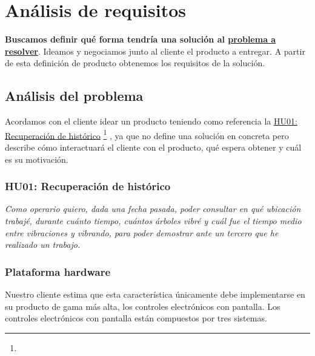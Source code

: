 \chapter{Análisis de requisitos}

\textbf{Buscamos definir qué forma tendría una solución al
\hyperref[sec:problema_a_resolver]{problema a resolver}}.
Ideamos y negociamos junto al cliente el producto a entregar.
A partir de esta definición de producto obtenemos los requisitos
de la solución.

\section{Análisis del problema}

Acordamos con el cliente idear un producto teniendo como referencia la
\hyperref[sec:HU01]{HU01: Recuperación de histórico}%
\footnote{%
}%
, ya que
no define una solución en concreta pero describe cómo interactuará
el cliente con el producto, qué espera obtener y cuál es su motivación.

\subsection{HU01: Recuperación de histórico} \label{sec:HU01}

{ \itshape Como operario quiero, dada una fecha pasada, poder consultar
en qué ubicación trabajé, durante cuánto tiempo, cuántos
árboles vibré y cuál fue el tiempo medio entre
vibraciones y vibrando, para poder demostrar ante un tercero
que he realizado un trabajo. }

\subsection{Plataforma hardware}

Nuestro cliente estima que esta característica únicamente debe implementarse
en su producto de gama más alta, los controles electrónicos con pantalla.
Los controles electrónicos con pantalla están compuestos por tres sistemas.

